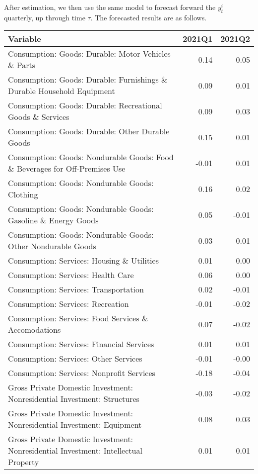 \documentclass[11pt, letterpaper]{article}\usepackage[]{graphicx}\usepackage[]{color}
\begin{document}
After estimation, we then use the same model to forecast forward the $y^i_t$ quarterly, up through time $\tau$. 
The forecasted results are as follows.
\begin{table}[H]
\centering
\begingroup\scriptsize
\begin{tabular}{lrr}
  \hline
Variable & 2021Q1 & 2021Q2 \\ 
  \hline
Consumption: Goods: Durable: Motor Vehicles \& Parts & 0.14 & 0.05 \\ 
  Consumption: Goods: Durable: Furnishings \& Durable Household Equipment & 0.09 & 0.01 \\ 
  Consumption: Goods: Durable: Recreational Goods \& Services & 0.09 & 0.03 \\ 
  Consumption: Goods: Durable: Other Durable Goods & 0.15 & 0.01 \\ 
  Consumption: Goods: Nondurable Goods: Food \& Beverages for Off-Premises Use & -0.01 & 0.01 \\ 
  Consumption: Goods: Nondurable Goods: Clothing & 0.16 & 0.02 \\ 
  Consumption: Goods: Nondurable Goods: Gasoline \& Energy Goods & 0.05 & -0.01 \\ 
  Consumption: Goods: Nondurable Goods: Other Nondurable Goods & 0.03 & 0.01 \\ 
  Consumption: Services: Housing \& Utilities & 0.01 & 0.00 \\ 
  Consumption: Services: Health Care & 0.06 & 0.00 \\ 
  Consumption: Services: Transportation & 0.02 & -0.01 \\ 
  Consumption: Services: Recreation & -0.01 & -0.02 \\ 
  Consumption: Services: Food Services \& Accomodations & 0.07 & -0.02 \\ 
  Consumption: Services: Financial Services & 0.01 & 0.01 \\ 
  Consumption: Services: Other Services & -0.01 & -0.00 \\ 
  Consumption: Services: Nonprofit Services & -0.18 & -0.04 \\ 
  Gross Private Domestic Investment: Nonresidential Investment: Structures & -0.03 & -0.02 \\ 
  Gross Private Domestic Investment: Nonresidential Investment: Equipment & 0.08 & 0.03 \\ 
  Gross Private Domestic Investment: Nonresidential Investment: Intellectual Property & 0.01 & 0.01 \\ 

\end{tabular}
\end{table}
\end{document}

